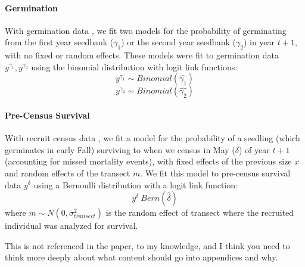 \documentclass[11pt]{article}
\begin{document}
\paragraph{Germination}
With germination data \cite{Miller2007}, we fit two models for the probability of germinating from the first year seedbank ($\gamma_1$) or the second year seedbank ($\gamma_2$) in year $t+1$, with no fixed or random effects.
These models were fit to germination data $y^{\gamma_1}, y^{\gamma_2}$  using the binomial distribution with logit link functions:
$$y^{\gamma_1} \sim Binomial(\hat{\gamma_1})$$
$$y^{\gamma_2} \sim Binomial(\hat{\gamma_2})$$

\paragraph{Pre-Census Survival}
With recruit census data \cite{Miller2006}, we fit a model for the probability of a seedling (which germinates in early Fall) surviving to when we census in May ($\delta$) of year $t+1$ (accounting for missed mortality events), with fixed effects of the previous size $x$ and random effects of the transect $m$.
We fit this model to pre-census survival data $y^{\delta}$ using a Bernoulli distribution with a logit link function: 
$$y^{\delta} ~ Bern(\hat{\delta})$$
where $m \sim N(0, \sigma_{transect}^2)$ is the random effect of transect where the recruited individual was analyzed for survival.

This is not referenced in the paper, to my knowledge, and I think you need to think more deeply about what content should go into appendices and why. 
%
%
%
%
\end{document}
